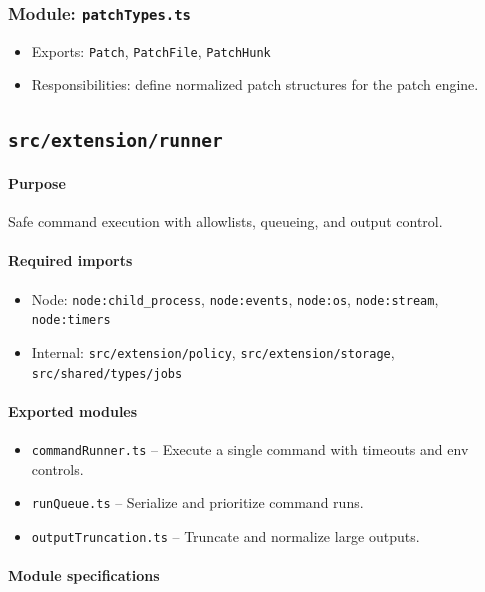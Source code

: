\documentclass[11pt]{article}
\begin{document}
\subsubsection*{Module: \texttt{patchTypes.ts}}
\begin{itemize}[noitemsep]
  \item Exports: \texttt{Patch}, \texttt{PatchFile}, \texttt{PatchHunk}
  \item Responsibilities: define normalized patch structures for the patch engine.
\end{itemize}

\subsection{\texttt{src/extension/runner}}
\paragraph{Purpose} Safe command execution with allowlists, queueing, and output control.

\paragraph{Required imports}
\begin{itemize}[noitemsep]
  \item Node: \texttt{node:child\_process}, \texttt{node:events}, \texttt{node:os}, \texttt{node:stream}, \texttt{node:timers}
  \item Internal: \texttt{src/extension/policy}, \texttt{src/extension/storage}, \texttt{src/shared/types/jobs}
\end{itemize}

\paragraph{Exported modules}
\begin{itemize}[noitemsep]
  \item \texttt{commandRunner.ts} -- Execute a single command with timeouts and env controls.
  \item \texttt{runQueue.ts} -- Serialize and prioritize command runs.
  \item \texttt{outputTruncation.ts} -- Truncate and normalize large outputs.
\end{itemize}

\paragraph{Module specifications}
\end{document}
